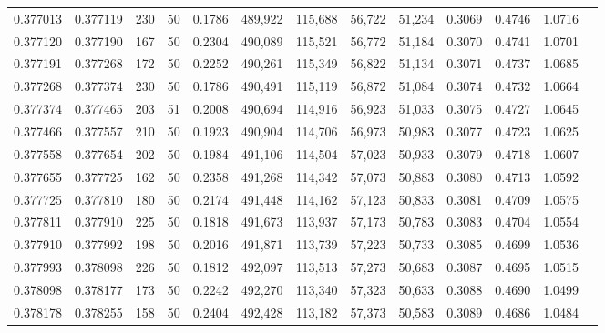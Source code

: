 \begin{tabular}{rrrrrrrrrrrrr}
0.377013 & 0.377119 &   230 &  50 &                                     0.1786 & 489,922 & 115,688 &  56,722 &  51,234 & 0.3069 & 0.4746 & 1.0716 \\
0.377120 & 0.377190 &   167 &  50 &                                     0.2304 & 490,089 & 115,521 &  56,772 &  51,184 & 0.3070 & 0.4741 & 1.0701 \\
0.377191 & 0.377268 &   172 &  50 &                                     0.2252 & 490,261 & 115,349 &  56,822 &  51,134 & 0.3071 & 0.4737 & 1.0685 \\
0.377268 & 0.377374 &   230 &  50 &                                     0.1786 & 490,491 & 115,119 &  56,872 &  51,084 & 0.3074 & 0.4732 & 1.0664 \\
0.377374 & 0.377465 &   203 &  51 &                                     0.2008 & 490,694 & 114,916 &  56,923 &  51,033 & 0.3075 & 0.4727 & 1.0645 \\
0.377466 & 0.377557 &   210 &  50 &                                     0.1923 & 490,904 & 114,706 &  56,973 &  50,983 & 0.3077 & 0.4723 & 1.0625 \\
0.377558 & 0.377654 &   202 &  50 &                                     0.1984 & 491,106 & 114,504 &  57,023 &  50,933 & 0.3079 & 0.4718 & 1.0607 \\
0.377655 & 0.377725 &   162 &  50 &                                     0.2358 & 491,268 & 114,342 &  57,073 &  50,883 & 0.3080 & 0.4713 & 1.0592 \\
0.377725 & 0.377810 &   180 &  50 &                                     0.2174 & 491,448 & 114,162 &  57,123 &  50,833 & 0.3081 & 0.4709 & 1.0575 \\
0.377811 & 0.377910 &   225 &  50 &                                     0.1818 & 491,673 & 113,937 &  57,173 &  50,783 & 0.3083 & 0.4704 & 1.0554 \\
0.377910 & 0.377992 &   198 &  50 &                                     0.2016 & 491,871 & 113,739 &  57,223 &  50,733 & 0.3085 & 0.4699 & 1.0536 \\
0.377993 & 0.378098 &   226 &  50 &                                     0.1812 & 492,097 & 113,513 &  57,273 &  50,683 & 0.3087 & 0.4695 & 1.0515 \\
0.378098 & 0.378177 &   173 &  50 &                                     0.2242 & 492,270 & 113,340 &  57,323 &  50,633 & 0.3088 & 0.4690 & 1.0499 \\
0.378178 & 0.378255 &   158 &  50 &                                     0.2404 & 492,428 & 113,182 &  57,373 &  50,583 & 0.3089 & 0.4686 & 1.0484 \\

\end{tabular}
